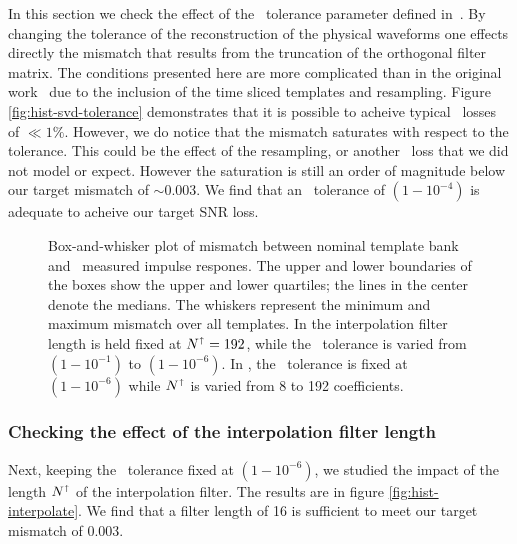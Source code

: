 In this section we check the effect of the \SVD\ tolerance parameter defined
in~\cite{Cannon:2010p10398}.  By changing the tolerance of the reconstruction
of the physical waveforms one effects directly the mismatch that results from
the truncation of the orthogonal filter matrix.  The conditions presented here
are more complicated than in the original work~\cite{Cannon:2010p10398} due to
the inclusion of the time sliced templates and resampling.  Figure
\ref{fig:hist-svd-tolerance} demonstrates that it is possible to acheive
typical \SNR\ losses of $\ll1\%$.  However, we do notice that the mismatch
saturates with respect to the tolerance.  This could be the effect of the
resampling, or another \SNR\ loss that we did not model or expect.  However the
saturation is still an order of magnitude below our target mismatch of
$\sim$0.003.  We find that an \SVD\ tolerance of $\left(1-10^{-4}\right)$ is
adequate to acheive our target SNR loss.
%
\begin{figure}
	\begin{center}
		\caption{Box-and-whisker plot of mismatch between nominal
template bank and \lloid\ measured impulse respones.  The upper and lower boundaries of
the boxes show the upper and lower quartiles; the lines in the center denote the medians.
The whiskers represent the minimum and maximum mismatch over all templates.  In 
 the interpolation filter length is held fixed
at $N^\shortuparrow = 192$, while the \SVD\ tolerance is varied from
$\left(1-10^{-1}\right)$ to $\left(1-10^{-6}\right)$.  In , the \SVD\ tolerance is fixed at $\left(1-10^{-6}\right)$ while $N^\shortuparrow$ is varied from 8 to 192 coefficients.}
	\end{center}
\end{figure}

\subsubsection{Checking the effect of the interpolation filter length}

Next, keeping the \SVD\ tolerance fixed at $\left(1-10^{-6}\right)$, we studied the
impact of the length $N^\shortuparrow$ of the interpolation filter.  The results are in
figure \ref{fig:hist-interpolate}.  We find that a filter length of 16 is sufficient
to meet our target mismatch of 0.003.

